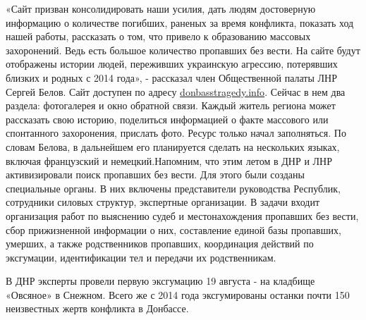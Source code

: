 «Сайт призван консолидировать наши усилия, дать людям достоверную информацию о
количестве погибших, раненых за время конфликта, показать ход нашей работы,
рассказать о том, что привело к образованию массовых захоронений. Ведь есть
большое количество пропавших без вести. На сайте будут отображены истории
людей, переживших украинскую агрессию, потерявших близких и родных с 2014
года», - рассказал член Общественной палаты ЛНР Сергей Белов. Сайт доступен по
адресу \url{donbasstragedy.info}. Сейчас в нем два раздела: фотогалерея и окно
обратной связи. Каждый житель региона может рассказать свою историю, поделиться
информацией о факте массового или спонтанного захоронения, прислать фото.
Ресурс только начал заполняться. По словам Белова, в дальнейшем его планируется
сделать на нескольких языках, включая французский и немецкий.Напомним, что этим
летом в ДНР и ЛНР активизировали поиск пропавших без вести. Для этого были
созданы специальные органы. В них включены представители руководства Республик,
сотрудники силовых структур, экспертные организации. В задачи входит
организация работ по выяснению судеб и местонахождения пропавших без вести,
сбор прижизненной информации о них, составление единой базы пропавших, умерших,
а также родственников пропавших, координация действий по эксгумации,
идентификации тел и передачи их родственникам. 

В ДНР эксперты провели первую эксгумацию 19 августа - на кладбище «Овсяное» в
Снежном. Всего же с 2014 года эксгумированы останки почти 150 неизвестных жертв
конфликта в Донбассе.
